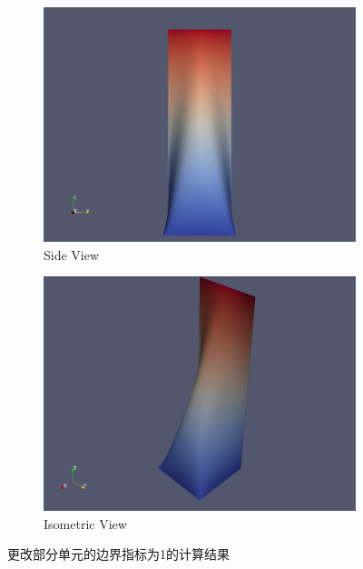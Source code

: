 \documentclass[12pt, a4paper]{article}
\numberwithin{equation}{section} %
\begin{document}
\begin{figure}[htbp]
    \vspace{1cm} %
    
    \begin{subfigure}{0.48\textwidth}
        \centering
        \includegraphics[width=\textwidth]{proj11.png}
        \caption{Side View}
        \label{fig3:side_view}
    \end{subfigure}
    \hfill
    \begin{subfigure}{0.48\textwidth}
        \centering
        \includegraphics[width=\textwidth]{proj12.png}
        \caption{Isometric View}
        \label{fig3:isometric_view}
    \end{subfigure}
    \caption{更改部分单元的边界指标为1的计算结果}
    \label{fig3:four_views}
\end{figure}
\end{document}
